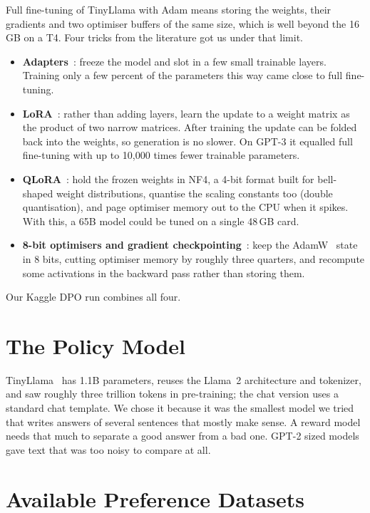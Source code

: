 Full fine-tuning of TinyLlama with Adam means storing the weights, their gradients and two optimiser buffers of the same size, which is well beyond the 16\,GB on a T4. Four tricks from the literature got us under that limit.
\begin{itemize}
  \item \textbf{Adapters}~\cite{houlsby2019adapters}: freeze the model and slot in a few small trainable layers. Training only a few percent of the parameters this way came close to full fine-tuning.
  \item \textbf{LoRA}~\cite{hu2022lora}: rather than adding layers, learn the update to a weight matrix as the product of two narrow matrices. After training the update can be folded back into the weights, so generation is no slower. On GPT-3 it equalled full fine-tuning with up to 10,000 times fewer trainable parameters.
  \item \textbf{QLoRA}~\cite{dettmers2023qlora}: hold the frozen weights in NF4, a 4-bit format built for bell-shaped weight distributions, quantise the scaling constants too (double quantisation), and page optimiser memory out to the CPU when it spikes. With this, a 65B model could be tuned on a single 48\,GB card.
  \item \textbf{8-bit optimisers and gradient checkpointing}~\cite{dettmers2022optimizers,chen2016checkpointing}: keep the AdamW~\cite{loshchilov2019adamw} state in 8 bits, cutting optimiser memory by roughly three quarters, and recompute some activations in the backward pass rather than storing them.
\end{itemize}
Our Kaggle DPO run combines all four.

\section{The Policy Model}
\label{sec:lit-slm}
TinyLlama~\cite{zhang2024tinyllama} has 1.1B parameters, reuses the Llama~2 architecture and tokenizer, and saw roughly three trillion tokens in pre-training; the chat version uses a standard chat template. We chose it because it was the smallest model we tried that writes answers of several sentences that mostly make sense. A reward model needs that much to separate a good answer from a bad one. GPT-2 sized models gave text that was too noisy to compare at all.

\section{Available Preference Datasets}
\label{sec:lit-data}


